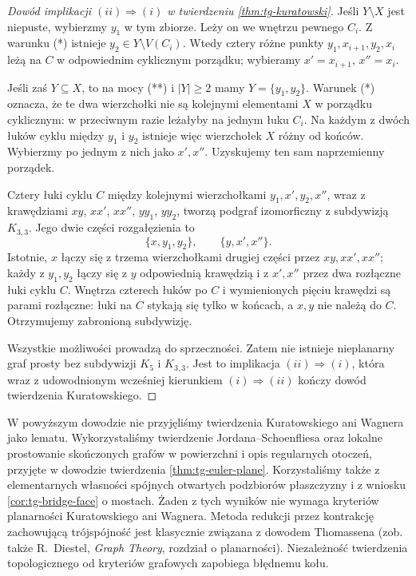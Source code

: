 \begin{proof}[Dowód implikacji
\texorpdfstring{$(ii)\Rightarrow(i)$}{(ii) => (i)}
w twierdzeniu \ref{thm:tg-kuratowski}]
Jeśli $Y\setminus X$
jest niepuste,
wybierzmy $y_1$
w tym zbiorze.
Leży on we wnętrzu
pewnego $C_i$.
Z warunku (*) istnieje
$y_2\in Y\setminus V(C_i)$.
Wtedy cztery
różne punkty
$y_1,x_{i+1},y_2,x_i$
leżą na $C$
w odpowiednim
cyklicznym porządku;
wybieramy
$x'=x_{i+1}$,
$x''=x_i$.

Jeśli zaś $Y\subseteq X$,
to na mocy (**) i
$|Y|\geq2$
mamy $Y=\{y_1,y_2\}$.
Warunek (*) oznacza,
że te dwa wierzchołki
nie są kolejnymi
elementami $X$
w porządku cyklicznym:
w przeciwnym razie
leżałyby na jednym
łuku $C_i$.
Na każdym z dwóch
łuków cyklu
między $y_1$ i $y_2$
istnieje więc
wierzchołek $X$
różny od końców.
Wybierzmy po jednym
z nich jako $x',x''$.
Uzyskujemy ten sam
naprzemienny porządek.

Cztery łuki cyklu $C$
między kolejnymi
wierzchołkami
$y_1,x',y_2,x''$,
wraz z krawędziami
$xy$, $xx'$, $xx''$,
$yy_1$, $yy_2$,
tworzą podgraf
izomorficzny z
subdywizją $K_{3,3}$.
Jego dwie części
rozgałęzienia to
\[
\{x,y_1,y_2\},
\qquad
\{y,x',x''\}.
\]
Istotnie, $x$ łączy się
z trzema wierzchołkami
drugiej części
przez $xy,xx',xx''$;
każdy z $y_1,y_2$
łączy się z $y$
odpowiednią krawędzią
i z $x',x''$
przez dwa rozłączne
łuki cyklu $C$.
Wnętrza czterech
łuków po $C$
i wymienionych
pięciu krawędzi
są parami rozłączne:
łuki na $C$
stykają się tylko
w końcach, a $x,y$
nie należą do $C$.
Otrzymujemy
zabronioną subdywizję.

Wszystkie możliwości
prowadzą do sprzeczności.
Zatem nie istnieje
nieplanarny graf prosty
bez subdywizji $K_5$
i $K_{3,3}$.
Jest to implikacja
$(ii)\Rightarrow(i)$,
która wraz z
udowodnionym wcześniej
kierunkiem
$(i)\Rightarrow(ii)$
kończy dowód twierdzenia
Kuratowskiego.
\end{proof}

\begin{uwaga}
W powyższym dowodzie
nie przyjęliśmy
twierdzenia Kuratowskiego
ani Wagnera jako lematu.
Wykorzystaliśmy twierdzenie Jordana--Schoenfliesa
oraz lokalne prostowanie skończonych grafów
w powierzchni i opis regularnych otoczeń, przyjęte
w dowodzie twierdzenia \ref{thm:tg-euler-plane}.
Korzystaliśmy także z elementarnych własności
spójnych otwartych podzbiorów płaszczyzny i z
wniosku \ref{cor:tg-bridge-face} o mostach.
Żaden z tych wyników nie wymaga kryteriów
planarności Kuratowskiego ani Wagnera.
Metoda redukcji przez
kontrakcję zachowującą
trójspójność jest
klasycznie związana
z dowodem Thomassena
(zob. także R.~Diestel,
\emph{Graph Theory},
rozdział o planarności).
Niezależność twierdzenia
topologicznego od
kryteriów grafowych
zapobiega błędnemu kołu.
\end{uwaga}

